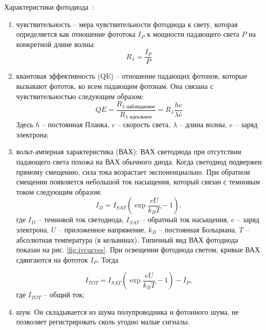 Характеристики фотодиода~\cite{OSI2006}:


\begin{enumerate}
    \item чувствительность \--- мера чувствительности фотодиода к свету, которая определяется как отношение фототока $I_P$ к мощности падающего света $P$ на конкретной длине волны:
    \begin{equation}
        R_\lambda = \frac{I_P}{P}
    \end{equation}
    \item квантовая эффективность (QE) \--- отношение падающих фотонов, которые вызывают фототок, ко всем падающим фотонам. Она связана с чувствительностью следующим образом:
    \begin{equation}
        QE = \frac{R_{\lambda\text{ наблюдаемое}}}{R_{\lambda\text{ идеальное}}} = R_\lambda\frac{hc}{\lambda \bar e}
    \end{equation}
    Здесь $h$ \--- постоянная Планка, $c$ \--- скорость света, $\lambda$ \--- длина волны, $e$ \--- заряд электрона;
    \item вольт-амперная характеристика (ВАХ): ВАХ светодиода при отсутствии падающего света похожа на ВАХ обычного диода. Когда светодиод подвержен прямому смещению, сила тока возрастает экспоненциально. При обратном смещении появляется небольшой ток насыщения, который связан с темновым током следующим образом:
    \begin{equation}
        I_D = I_{SAT} \left(\exp{\frac{e U}{k_B T}-1}\right),
    \end{equation}
    где $I_D$ \--- темновой ток светодиода, $I_{SAT}$ \--- обратный ток насыщения, $e$ \--- заряд электрона, $U$ \--- приложенное напряжение, $k_B$ \--- постоянная Больцмана, $T$ \--- абсолютная температура (в кельвинах). Типичный вид ВАХ фотодиода показан на рис. \ref{fig:ivcurves}. При освещении фотодиода светом, кривые ВАХ сдвигаются на фототок $I_P$. Тогда 

    \begin{equation}
        I_{TOT} = I_{SAT} \left(\exp{\frac{e U}{k_B T}-1}\right) - I_P,
    \end{equation}
    где $I_{TOT}$ \--- общий ток;
    \item шум. Он складывается из шума полупроводника и фотонного шума, не позволяет регистрировать сколь угодно малые сигналы.
\end{enumerate}

